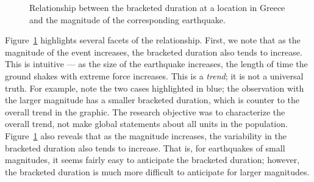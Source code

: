\documentclass[
  letterpaper,
  DIV=11,
  numbers=noendperiod]{scrreprt}
\theoremstyle{plain}
\theoremstyle{definition}
\theoremstyle{definition}
\theoremstyle{remark}
\begin{document}
\begin{figure}


\caption{\label{fig-regsummaries-magnitude}Relationship between the
bracketed duration at a location in Greece and the magnitude of the
corresponding earthquake.}

\end{figure}%

Figure~\ref{fig-regsummaries-magnitude} highlights several facets of the
relationship. First, we note that as the magnitude of the event
increases, the bracketed duration also tends to increase. This is
intuitive --- as the size of the earthquake increases, the length of
time the ground shakes with extreme force increases. This is a
\emph{trend}; it is not a universal truth. For example, note the two
cases highlighted in blue; the observation with the larger magnitude has
a smaller bracketed duration, which is counter to the overall trend in
the graphic. The research objective was to characterize the overall
trend, not make global statements about all units in the population.
Figure~\ref{fig-regsummaries-magnitude} also reveals that as the
magnitude increases, the variability in the bracketed duration also
tends to increase. That is, for earthquakes of small magnitudes, it
seems fairly easy to anticipate the bracketed duration; however, the
bracketed duration is much more difficult to anticipate for larger
magnitudes.
\end{document}
